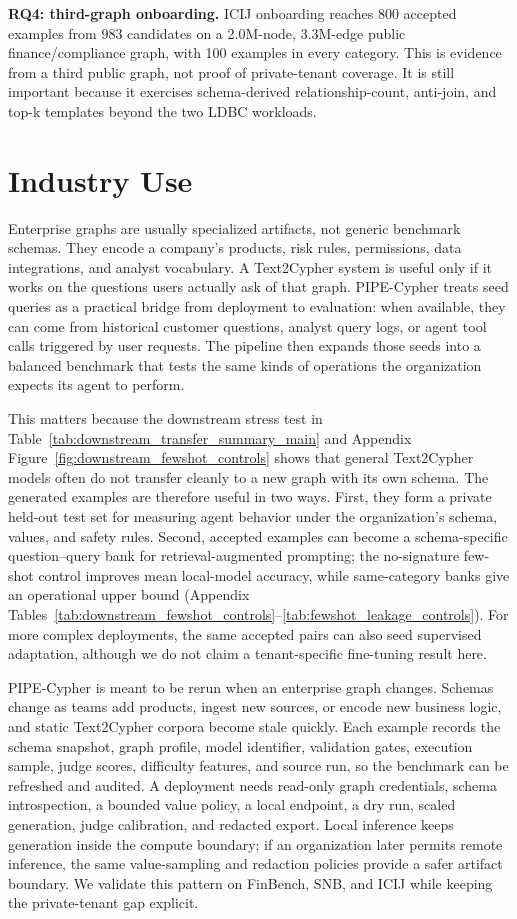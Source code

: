\documentclass[11pt]{article}
\begin{document}


\noindent\textbf{RQ4: third-graph onboarding.} ICIJ onboarding reaches 800 accepted examples from 983 candidates on a 2.0M-node, 3.3M-edge public finance/compliance graph, with 100 examples in every category. This is evidence from a third public graph, not proof of private-tenant coverage. It is still important because it exercises schema-derived relationship-count, anti-join, and top-k templates beyond the two LDBC workloads.

\section{Industry Use}
Enterprise graphs are usually specialized artifacts, not generic benchmark schemas. They encode a company's products, risk rules, permissions, data integrations, and analyst vocabulary. A Text2Cypher system is useful only if it works on the questions users actually ask of that graph. PIPE-Cypher treats seed queries as a practical bridge from deployment to evaluation: when available, they can come from historical customer questions, analyst query logs, or agent tool calls triggered by user requests. The pipeline then expands those seeds into a balanced benchmark that tests the same kinds of operations the organization expects its agent to perform.

This matters because the downstream stress test in Table~\ref{tab:downstream_transfer_summary_main} and Appendix Figure~\ref{fig:downstream_fewshot_controls} shows that general Text2Cypher models often do not transfer cleanly to a new graph with its own schema. The generated examples are therefore useful in two ways. First, they form a private held-out test set for measuring agent behavior under the organization's schema, values, and safety rules. Second, accepted examples can become a schema-specific question--query bank for retrieval-augmented prompting; the no-signature few-shot control improves mean local-model accuracy, while same-category banks give an operational upper bound (Appendix Tables~\ref{tab:downstream_fewshot_controls}--\ref{tab:fewshot_leakage_controls}). For more complex deployments, the same accepted pairs can also seed supervised adaptation, although we do not claim a tenant-specific fine-tuning result here.

PIPE-Cypher is meant to be rerun when an enterprise graph changes. Schemas change as teams add products, ingest new sources, or encode new business logic, and static Text2Cypher corpora become stale quickly. Each example records the schema snapshot, graph profile, model identifier, validation gates, execution sample, judge scores, difficulty features, and source run, so the benchmark can be refreshed and audited. A deployment needs read-only graph credentials, schema introspection, a bounded value policy, a local endpoint, a dry run, scaled generation, judge calibration, and redacted export. Local inference keeps generation inside the compute boundary; if an organization later permits remote inference, the same value-sampling and redaction policies provide a safer artifact boundary. We validate this pattern on FinBench, SNB, and ICIJ while keeping the private-tenant gap explicit.
\end{document}
